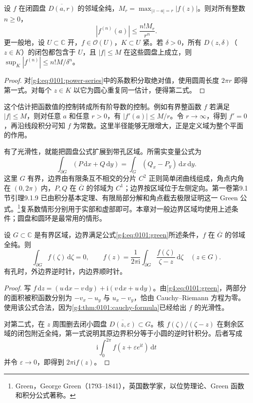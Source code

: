 \begin{proposition}[Cauchy 估计]
	\label{g4:prop:0101:cauchy-estimate}
	设 \(f\) 在闭圆盘 \(\overline{D(a,r)}\) 的邻域全纯，\(M_r=\max_{|z-a|=r}|f(z)|\)。则对所有整数 \(n\ge0\)，
	\[
		|f^{(n)}(a)|\le\frac{n!M_r}{r^n}.
	\]
	更一般地，设 \(U\subset\mathbb C\) 开，\(f\in\mathcal O(U)\)，\(K\subset U\) 紧。若 \(\delta>0\)，所有 \(D(z,\delta)\)（\(z\in K\)）的闭包都包含于 \(U\)，且 \(|f|\le M\) 在这些圆盘上成立，则 \(\sup_K|f^{(n)}|\le n!M/\delta^n\)。
\end{proposition}
\begin{proof}
	对\eqref{g4:eq:0101:power-series}中的系数积分取绝对值，使用圆周长度 \(2\pi r\) 即得第一式。对每个 \(z\in K\) 以它为圆心重复同一估计，便得第二式。
\end{proof}

这个估计把函数值的控制转成所有阶导数的控制。例如有界整函数 \(f\) 若满足 \(|f|\le M\)，则对任意 \(a\) 和任意 \(r>0\)，有 \(|f'(a)|\le M/r\)。令 \(r\to\infty\)，得到 \(f'=0\)，再沿线段积分可知 \(f\) 为常数。这里半径能够无限增大，正是定义域为整个平面的作用。

\ProseParagraphBreak

有了光滑性，就能把圆盘公式扩展到带孔区域。所需实变量公式为
\begin{equation}
	\label{g4:eq:0101:green}
	\int_{\partial G}(P\,\mathrm{d}x+Q\,\mathrm{d}y)
	=\int_G(Q_x-P_y)\,\mathrm{d}x\,\mathrm{d}y.
\end{equation}
这里 \(G\) 有界，边界由有限条互不相交的分片 \(C^2\) 正则简单闭曲线组成，角点内角在 \((0,2\pi)\) 内，\(P,Q\) 在 \(\overline G\) 的邻域为 \(C^1\)；边界按区域位于左侧定向。第一卷第9.1节引理9.1.9 已由积分基本定理、有限局部分解和角点截去极限证明这一 Green 公式。\footnote{Green，George Green（1793--1841），英国数学家，以位势理论、Green 函数和积分公式著称。}复系数情形分别用于实部和虚部即可。本章对一般边界区域均使用上述条件；圆盘和圆环是最常用的情形。

\begin{proposition}
	\label{g4:prop:0101:cauchy-domain}
	设 \(G\subset\mathbb C\) 是有界区域，边界满足公式\eqref{g4:eq:0101:green}所述条件，\(f\) 在 \(\overline G\) 的邻域全纯。则
	\[
		\int_{\partial G} f(\zeta)\,\mathrm{d}\zeta=0,
		\qquad
		f(z)=\frac1{2\pi\mathrm i}\int_{\partial G}
		\frac{f(\zeta)}{\zeta-z}\,\mathrm{d}\zeta\quad(z\in G).
	\]
	有孔时，外边界逆时针，内边界顺时针。
\end{proposition}
\begin{proof}
	写 \(f\,\mathrm{d}z=(u\,\mathrm{d}x-v\,\mathrm{d}y)+\mathrm i(v\,\mathrm{d}x+u\,\mathrm{d}y)\)。由\eqref{g4:eq:0101:green}，两部分的面积被积函数分别为 \(-v_x-u_y\) 与 \(u_x-v_y\)，恰由 Cauchy--Riemann 方程为零。使用该公式合法，因为\cref{g4:thm:0101:cauchy-formula}已经给出 \(f\) 的光滑性。

	对第二式，在 \(z\) 周围删去闭小圆盘 \(\overline{D(z,\varepsilon)}\subset G\)。核 \(f(\zeta)/(\zeta-z)\) 在剩余区域的闭包附近全纯，第一式说明其原边界积分等于小圆的逆时针积分。后者写成
	\[
		\mathrm i\int_0^{2\pi} f(z+\varepsilon e^{\mathrm i t})\,\mathrm{d}t
	\]
	并令 \(\varepsilon\to0\)，即得到 \(2\pi\mathrm i f(z)\)。
\end{proof}

